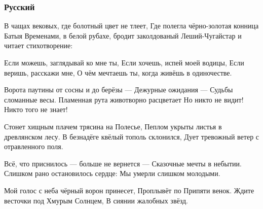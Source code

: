  
 

\subsubsection{Русский}
\label{sec:songs.tin_soncja.pisnja_chugajstera.rus}

В чащах вековых, где болотный цвет не тлеет,
Где полегла чёрно-золотая конница Батыя
Временами, в белой рубахе, бродит заколдованый
Леший-Чугайстар и читает стихотворение:

Если можешь, заглядывай ко мне ты,
Если хочешь, испей моей водицы,
Если веришь, расскажи мне,
О чём мечтаешь ты, когда живёшь в одиночестве.

Ворота паутины от сосны и до берёзы —
Дежурные ожидания --- Судьбы сломанные весы.
Пламенная рута животворно расцветает
Но никто не видит! Никто того не знает!

Стонет хищным плачем трясина на Полесье,
Пеплом укрыты листья в древлянском лесу.
В безнадёге квёлый тополь склонился,
Дует тревожный ветер с отравленного поля.

Всё, что приснилось --- больше не вернется —
Сказочные мечты в небытии.
Слишком рано остановилось сердце:
Мы умерли слишком молодыми.

Мой голос с неба чёрный ворон принесет,
Проплывёт по Припяти венок.
Ждите весточки под Хмурым Солнцем,
В сиянии жалобных звёзд.
